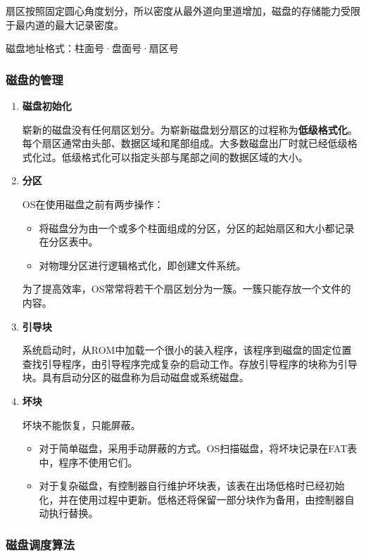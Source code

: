 \documentclass[12pt, a4paper, oneside]{ctexart}
\begin{document}
扇区按照固定圆心角度划分，所以密度从最外道向里道增加，磁盘的存储能力受限于最内道的最大记录密度。

磁盘地址格式：柱面号·盘面号·扇区号

\subsubsection{磁盘的管理}

\begin{enumerate}
  \item {\bf 磁盘初始化}
  
  崭新的磁盘没有任何扇区划分。为崭新磁盘划分扇区的过程称为\textbf{低级格式化}。每个扇区通常由头部、数据区域和尾部组成。大多数磁盘出厂时就已经低级格式化过。低级格式化可以指定头部与尾部之间的数据区域的大小。

  \item {\bf 分区}
  
  OS在使用磁盘之前有两步操作：
  \begin{itemize}
    \item 将磁盘分为由一个或多个柱面组成的分区，分区的起始扇区和大小都记录在分区表中。
    \item 对物理分区进行逻辑格式化，即创建文件系统。
  \end{itemize}

  为了提高效率，OS常常将若干个扇区划分为一簇。一簇只能存放一个文件的内容。

  \item {\bf 引导块}
  
  系统启动时，从ROM中加载一个很小的装入程序，该程序到磁盘的固定位置查找引导程序，由引导程序完成复杂的启动工作。存放引导程序的块称为引导块。具有启动分区的磁盘称为启动磁盘或系统磁盘。

  \item {\bf 坏块}
  
  坏块不能恢复，只能屏蔽。
  \begin{itemize}
    \item 对于简单磁盘，采用手动屏蔽的方式。OS扫描磁盘，将坏块记录在FAT表中，程序不使用它们。
    \item 对于复杂磁盘，有控制器自行维护坏块表，该表在出场低格时已经初始化，并在使用过程中更新。低格还将保留一部分块作为备用，由控制器自动执行替换。
  \end{itemize}
\end{enumerate}

\subsubsection{磁盘调度算法}
\end{document}
